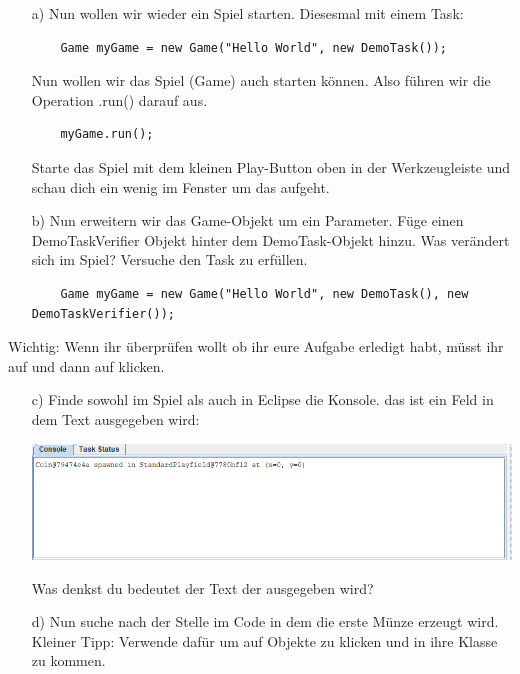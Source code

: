 

\begin{enumerate}
    \item[a)] Nun wollen wir wieder ein Spiel starten. Diesesmal mit einem Task:
    
    \begin{lstlisting}
    Game myGame = new Game("Hello World", new DemoTask());
    \end{lstlisting}
    
    Nun wollen wir das Spiel (Game) auch starten können. Also führen wir die Operation .run() darauf aus. 
    
    \begin{lstlisting}
    myGame.run();
    \end{lstlisting}
    
    Starte das Spiel mit dem kleinen Play-Button oben in der Werkzeugleiste und schau dich ein wenig im Fenster um das aufgeht.
    
    \item[b)] Nun erweitern wir das Game-Objekt um ein Parameter. Füge einen DemoTaskVerifier Objekt hinter dem DemoTask-Objekt hinzu. Was verändert sich im Spiel? Versuche den Task zu erfüllen.
    
    \begin{lstlisting}
    Game myGame = new Game("Hello World", new DemoTask(), new DemoTaskVerifier());
    \end{lstlisting}
    
    \end{enumerate}
    \begin{Infobox}
    Wichtig: Wenn ihr überprüfen wollt ob ihr eure Aufgabe erledigt habt, müsst ihr auf  und dann auf  klicken.
    \end{Infobox}
    \begin{enumerate}
    
    \item[c)] Finde sowohl im Spiel als auch in Eclipse die Konsole. das ist ein Feld in dem Text ausgegeben wird:
    \begin{center}
        \includegraphics[width=\linewidth]{./figures/console.PNG}
    \end{center}
    
    Was denkst du bedeutet der Text der ausgegeben wird?
    
    \item[d)] Nun suche nach der Stelle im Code in dem die erste Münze erzeugt wird. Kleiner Tipp: Verwende dafür  um auf Objekte zu klicken und in ihre Klasse zu kommen.
\end{enumerate}

